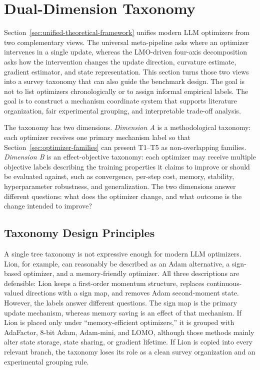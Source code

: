 \section{Dual-Dimension Taxonomy}
\label{sec:taxonomy}

Section~\ref{sec:unified-theoretical-framework} unifies modern LLM optimizers
from two complementary views.  The universal meta-pipeline asks where an
optimizer intervenes in a single update, whereas the LMO-driven four-axis
decomposition asks how the intervention changes the update direction,
curvature estimate, gradient estimator, and state representation.  This
section turns those two views into a survey taxonomy that can also guide the
benchmark design.  The goal is not to list optimizers chronologically or to
assign informal empirical labels.  The goal is to construct a mechanism
coordinate system that supports literature organization, fair experimental
grouping, and interpretable trade-off analysis.

The taxonomy has two dimensions.  \emph{Dimension A} is a methodological
taxonomy: each optimizer receives one primary mechanism label so that
Section~\ref{sec:optimizer-families} can present T1--T5 as non-overlapping
families.  \emph{Dimension B} is an effect-objective taxonomy: each optimizer
may receive multiple objective labels describing the training properties it
claims to improve or should be evaluated against, such as convergence,
per-step cost, memory, stability, hyperparameter robustness, and
generalization.  The two dimensions answer different questions: what does the
optimizer change, and what outcome is the change intended to improve?

\subsection{Taxonomy Design Principles}
\label{sec:taxonomy-principles}

A single tree taxonomy is not expressive enough for modern LLM optimizers. Lion, for example, can reasonably be described as an Adam alternative, a sign-based optimizer, and a memory-friendly optimizer. All three descriptions are defensible: Lion keeps a first-order momentum structure, replaces continuous-valued directions with a sign map, and removes Adam second-moment state. However, the labels answer different questions.
The sign map is the primary update mechanism, whereas memory saving is an effect of that mechanism.  If Lion is placed only under ``memory-efficient optimizers,'' it is grouped with AdaFactor, 8-bit Adam, Adam-mini, and LOMO, although those methods mainly alter state storage, state sharing, or gradient lifetime. If Lion is copied into every relevant branch, the taxonomy loses its role as a clean survey organization and an experimental grouping rule.

